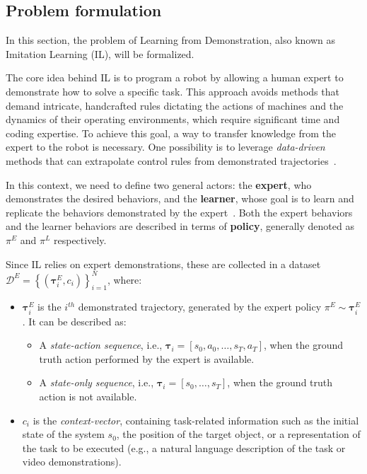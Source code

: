 \subsection{Problem formulation}
\label{sec:problem_formulation}
In this section, the problem of Learning from Demonstration, also known as Imitation Learning (IL), will be formalized.

The core idea behind IL is to program a robot by allowing a human expert to demonstrate how to solve a specific task. This approach avoids methods that demand intricate, handcrafted rules dictating the actions of machines and the dynamics of their operating environments, which require significant time and coding expertise. To achieve this goal, a way to transfer knowledge from the expert to the robot is necessary. One possibility is to leverage \textit{data-driven} methods that can extrapolate control rules from demonstrated trajectories~\cite{osa2018algorithmic}.

In this context, we need to define two general actors: the \textbf{expert}, who demonstrates the desired behaviors, and the \textbf{learner}, whose goal is to learn and replicate the behaviors demonstrated by the expert~\cite{osa2018algorithmic,zare2024survey}. Both the expert behaviors and the learner behaviors are described in terms of \textbf{policy}, generally denoted as $\pi^{E}$ and $\pi^{L}$ respectively.

Since IL relies on expert demonstrations, these are collected in a dataset $\mathcal{D}^{E}=\left\{\left(\boldsymbol{\tau}^{E}_{i}, c_{i}\right)\right\}_{i=1}^{N}$, where:
\begin{itemize}[noitemsep]
    \item $\boldsymbol{\tau}^{E}_{i}$ is the $i^{th}$ demonstrated trajectory, generated by the expert policy $\pi^{E}\sim\boldsymbol{\tau}^{E}_{i}$. It can be described as:
        \begin{itemize}[noitemsep]
            \item A \textit{state-action sequence}, i.e., $\boldsymbol{\tau}_{i} = [s_{0}, a_{0}, \dots, s_{T}, a_{T}]$, when the ground truth action performed by the expert is available.
            \item A \textit{state-only sequence}, i.e., $\boldsymbol{\tau}_{i} = [s_{0}, \dots, s_{T}]$, when the ground truth action is not available.
        \end{itemize}
    \item $c_{i}$ is the \textit{context-vector}, containing task-related information such as the initial state of the system $s_{0}$, the position of the target object, or a representation of the task to be executed (e.g., a natural language description of the task or video demonstrations).
\end{itemize}

